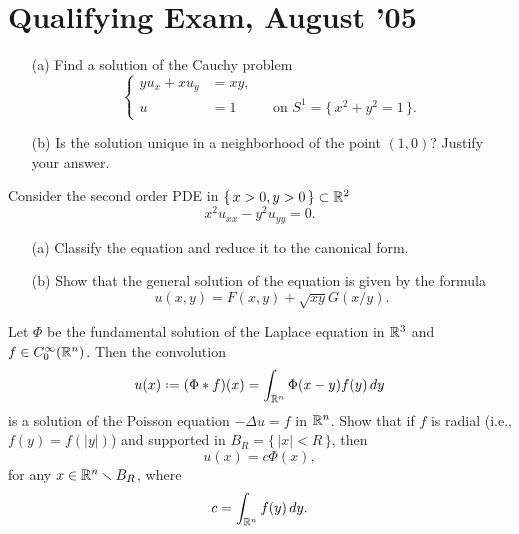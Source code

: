 \section{Qualifying Exam, August '05}
\begin{problem}
  \hfill
  \begin{itemize}[noitemsep]
  \item[(a)] Find a solution of the Cauchy problem
    \[
      \left\{
        \begin{aligned}
          yu_x+xu_y&=xy,\\
          u&=1&&\text{on \(S^1=\bigl\{\,x^2+y^2=1\,\bigr\}\)}.
        \end{aligned}
      \right.
    \]
  \item[(b)] Is the solution unique in a neighborhood of the point
    \((1,0)\)? Justify your answer.
  \end{itemize}
\end{problem}
\begin{solution}
\end{solution}

\begin{problem}
  Consider the second order PDE in \(\{\,x>0,y>0\,\}\subset\mathbb{R}^2\)
  \[
    x^2u_{xx}-y^2u_{yy}=0.
  \]
  \begin{itemize}[noitemsep]
  \item[(a)] Classify the equation and reduce it to the canonical form.
  \item[(b)] Show that the general solution of the equation is given by the
    formula
    \[
      u(x,y)=F(x,y)+\sqrt{xy}G(x/y).
    \]
  \end{itemize}
\end{problem}
\begin{solution}
\end{solution}

\begin{problem}
  Let \(\Phi\) be the fundamental solution of the Laplace equation in
  \(\mathbb{R}^3\) and \(f\in C_0^\infty(\mathbb{R}^n)\). Then the convolution
  \[
    u(x)\defeq(\Phi*f)(x)=\int_{\bbR^n}\Phi(x-y)f(y)\diff y
  \]
  is a solution of the Poisson equation \(-\Delta u=f\) in \(\mathbb{R}^n\). Show
  that if \(f\) is radial (i.e., \(f(y)=f(|y|)\)) and supported in
  \(B_R=\{\,|x|<R\,\}\), then
  \[
    u(x)=c\Phi(x),
  \]
  for any \(x\in\mathbb{R}^n\smallsetminus B_R\), where
  \[
    c=\int_{\mathbb{R}^n}f(y)\mathop{}\!d y.
  \]

\end{problem}
\begin{solution}
\end{solution}

